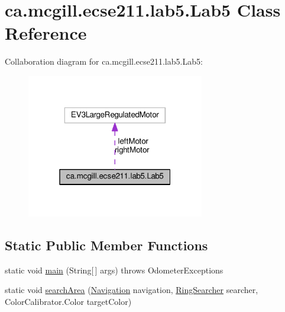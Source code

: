 \hypertarget{classca_1_1mcgill_1_1ecse211_1_1lab5_1_1_lab5}{}\section{ca.\+mcgill.\+ecse211.\+lab5.\+Lab5 Class Reference}
\label{classca_1_1mcgill_1_1ecse211_1_1lab5_1_1_lab5}


Collaboration diagram for ca.\+mcgill.\+ecse211.\+lab5.\+Lab5\+:\nopagebreak
\begin{figure}[H]
\begin{center}
\leavevmode
\includegraphics[width=220pt]{classca_1_1mcgill_1_1ecse211_1_1lab5_1_1_lab5__coll__graph}
\end{center}
\end{figure}
\subsection*{Static Public Member Functions}
\begin{DoxyCompactItemize}
\item 
static void \hyperlink{classca_1_1mcgill_1_1ecse211_1_1lab5_1_1_lab5_a82cca51f550ed0eb016bb2082d3fe755}{main} (String\mbox{[}$\,$\mbox{]} args)  throws Odometer\+Exceptions 
\item 
static void \hyperlink{classca_1_1mcgill_1_1ecse211_1_1lab5_1_1_lab5_a0e80ac0068ef1ab41cfb571b8c65845c}{search\+Area} (\hyperlink{classca_1_1mcgill_1_1ecse211_1_1lab5_1_1_navigation}{Navigation} navigation, \hyperlink{classca_1_1mcgill_1_1ecse211_1_1lab5_1_1_ring_searcher}{Ring\+Searcher} searcher, Color\+Calibrator.\+Color target\+Color)
\end{DoxyCompactItemize}
